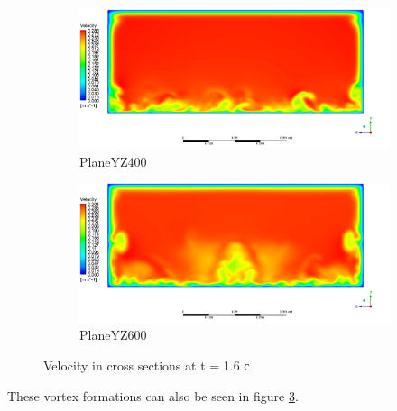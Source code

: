	\begin{figure}[H]
		\begin{subfigure}{.5\textwidth}
			\centering
			\includegraphics[width=1.1\linewidth]{../Assets/T16_Velocity_ContourYZ400}
			\caption{PlaneYZ400}
			\label{fig:T16VelocityContourYZ340}
		\end{subfigure}%
		\begin{subfigure}{.5\textwidth}
			\centering
			\includegraphics[width=1.1\linewidth]{../Assets/T16_Velocity_ContourYZ600}
			\caption{PlaneYZ600}
			\label{fig:T16VelocityContourYZ400}
		\end{subfigure}
		\caption{Velocity in cross sections at t = 1.6 с}
		\label{fig:T16VelocityContourYZ}
	\end{figure}
	These vortex formations can also be seen in figure \ref{fig:T16VelocityContourYZ}. 
	

